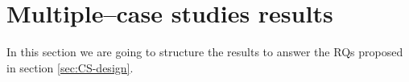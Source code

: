 

\section{Multiple--case studies results}
\label{sec:CS-Results} 
In this section we are going to structure the results to answer the \gls{RQs} proposed in section \ref{sec:CS-design}.

